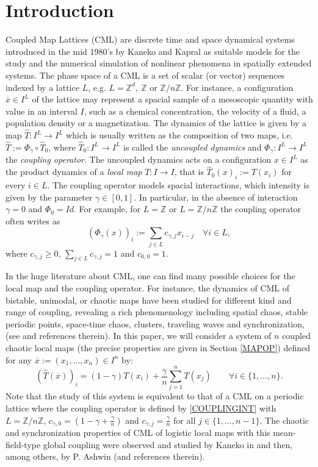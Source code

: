 \documentclass[12pt,reqno,a4paper]{amsart}
\newcommand{\Z}{{\mathbb Z}}
\newcommand{\T}{{\mathcal{T}}}
\def\ox{\overline{x}}
\def\Z{\ensuremath{\mathbb Z}}
\def\T{\hat{T}}
\begin{document}
\section{Introduction}
Coupled Map Lattices (CML)  are discrete time and space dynamical systems introduced in the mid 1980's by Kaneko and Kapral
as suitable models for the study and the numerical simulation of nonlinear phenomena in spatially extended systems.
The phase space of a CML is a set of  scalar (or vector)  sequences indexed by a lattice $L$,  e.g. $L=\Z^d,\ \Z$ or $\Z/n\Z$.
For instance, a configuration ${\ox\in I^L}$ of the lattice may represent a spacial sample of a  mesoscopic quantity with value in an interval $I$, such as a chemical concentration, the velocity of a fluid, a population density or a magnetization.
The dynamics of  the lattice is given by a map $\T:I^{L}\to I^{L}$ which is usually written as the composition of two maps, i.e. $\T:=\Phi_\gamma\circ\T_0$, where $\T_0:I^{L}\to I^{L}$ is called the {\it uncoupled dynamics} and $\Phi_\gamma :I^{L}\to I^{L}$ the {\it coupling operator}.
The uncoupled dynamics acts on a configuration $x\in I^{L}$ as the product dynamics of
a {\it local map} $T:I\to I$, that is $\T_0(x)_i:=T(x_i)$ for every $i\in L$.  The coupling operator models  spacial interactions, which intensity is given by the parameter $\gamma\in[0,1]$.
In particular, in the absence of interaction  $\gamma=0$ and $\Phi_0=Id$.
For example, for $L=\Z$ or $L=\Z/n\Z$ the coupling operator often writes as
\begin{equation}\label{COUPLINGINT}
(\Phi_\gamma(x))_i:=\sum_{j\in L}c_{\gamma,j}x_{i-j} \quad\forall i\in L,
\end{equation}
where $c_{\gamma,j}\geq 0$, $\sum_{j\in L}c_{\gamma,j}=1$ and $c_{0,0}=1$.

In the huge literature about CML, one can find many possible choices for the local map and the coupling operator. For instance, the dynamics of CML of bistable, unimodal, or chaotic maps have been studied for different kind and range of coupling, revealing a rich phenomenology including spatial chaos, stable periodic points, space-time chaos, clusters, traveling waves and synchronization, (see \cite{CK87, FC, K93} and references therein).
In this paper, we will consider a system of $n$ coupled chaotic local maps (the precise properties are given in Section \ref{MAPOP})  defined  for
any $\ox:=(x_1,\dots,x_n)\in I^n$ by:
$$
(\T(\ox))_i=(1-\gamma)T(x_i)+\frac{\gamma}{n}\sum_{j=1}^n T(x_{j})\qquad \forall i\in \{1,\dots,n\}.
$$
Note that the study of this system is equivalent to that of a CML  on a periodic lattice where the coupling operator is defined by \eqref{COUPLINGINT} with $L=\Z/n\Z$, $c_{\gamma,0}=(1-\gamma+\frac{\gamma}{n})$ and  $c_{\gamma,j}=\frac{\gamma}{n}$ for all $j\in\{1,\dots,n-1\}$.
The chaotic and synchronization properties of CML of logistic local maps with this mean-field-type global coupling were observed and studied by Kaneko in \cite{KA} and then, among others,  by P. Ashwin \cite{PA} (and references therein).
\end{document}
